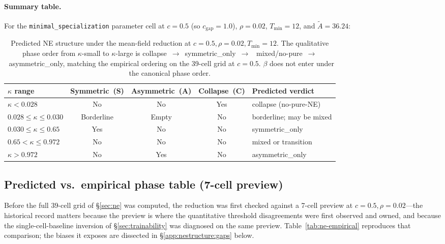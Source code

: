\documentclass{anvil-paper}
\begin{document}
\paragraph{Summary table.}
For the \texttt{minimal\_specialization} parameter cell at $c{=}0.5$
(so $c_{\text{gap}}{=}1.0$), $\rho{=}0.02$, $T_{\min}{=}12$, and
$\tilde A=36.24$:

\begin{table}[h]
  \centering
  \small
  \begin{tabular}{lccc l}
    \toprule
    $\kappa$ range & Symmetric~(S) & Asymmetric~(A) & Collapse~(C)
                   & Predicted verdict \\
    \midrule
    $\kappa<0.028$            & No & No & Yes & \textsf{collapse} (no-pure-NE) \\
    $0.028\leq\kappa\leq 0.030$ & Borderline & Empty & No & borderline; may be \textsf{mixed} \\
    $0.030\leq\kappa\leq 0.65$  & Yes & No  & No  & \textsf{symmetric\_only} \\
    $0.65<\kappa\leq 0.972$     & No  & No  & No  & \textsf{mixed} or transition \\
    $\kappa>0.972$              & No  & Yes & No  & \textsf{asymmetric\_only} \\
    \bottomrule
  \end{tabular}
  \caption{Predicted NE structure under the mean-field reduction at
  $c{=}0.5,\rho{=}0.02,T_{\min}{=}12$. The qualitative phase order
  from $\kappa$-small to $\kappa$-large is
  \textsf{collapse}~$\to$~\textsf{symmetric\_only}~$\to$~%
  \textsf{mixed}/no-pure~$\to$~\textsf{asymmetric\_only}, matching the
  empirical ordering on the 39-cell grid at $c{=}0.5$. $\beta$ does not
  enter under the canonical phase order.}
  \label{tab:ne-predicted}
\end{table}

\subsection{Predicted vs.\ empirical phase table (7-cell preview)}
\label{app:nestructure:phasetable}

Before the full $39$-cell grid of \S\ref{sec:ne} was computed, the
reduction was first checked against a 7-cell preview at
$c{=}0.5,\rho{=}0.02$---the historical record matters because the
preview is where the quantitative threshold disagreements were first
observed and owned, and because the single-cell-baseline inversion of
\S\ref{sec:trainability} was diagnosed on the same preview.
Table~\ref{tab:ne-empirical} reproduces that comparison; the biases it
exposes are dissected in \S\ref{app:nestructure:gaps} below.
\end{document}

